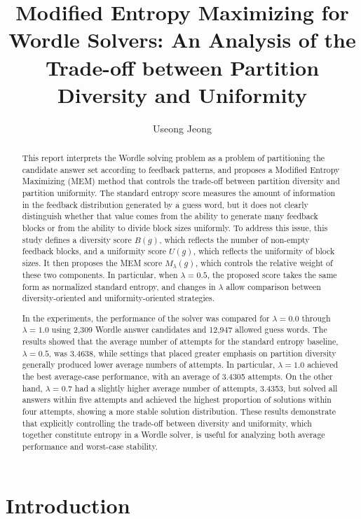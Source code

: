 \documentclass[11pt]{article}
\title{Modified Entropy Maximizing for Wordle Solvers: An Analysis of the Trade-off between Partition Diversity and Uniformity}
\author{
    Useong Jeong
}
\date{}
\begin{document}
\maketitle


\begin{abstract}
This report interprets the Wordle solving problem as a problem of partitioning the candidate answer set according to feedback patterns, and proposes a Modified Entropy Maximizing (MEM) method that controls the trade-off between partition diversity and partition uniformity.
The standard entropy score measures the amount of information in the feedback distribution generated by a guess word, but it does not clearly distinguish whether that value comes from the ability to generate many feedback blocks or from the ability to divide block sizes uniformly.
To address this issue, this study defines a diversity score $B(g)$, which reflects the number of non-empty feedback blocks, and a uniformity score $U(g)$, which reflects the uniformity of block sizes.
It then proposes the MEM score $M_{\lambda}(g)$, which controls the relative weight of these two components.
In particular, when $\lambda = 0.5$, the proposed score takes the same form as normalized standard entropy, and changes in $\lambda$ allow comparison between diversity-oriented and uniformity-oriented strategies.

In the experiments, the performance of the solver was compared for $\lambda = 0.0$ through $\lambda = 1.0$ using 2,309 Wordle answer candidates and 12,947 allowed guess words.
The results showed that the average number of attempts for the standard entropy baseline, $\lambda = 0.5$, was 3.4638, while settings that placed greater emphasis on partition diversity generally produced lower average numbers of attempts.
In particular, $\lambda = 1.0$ achieved the best average-case performance, with an average of 3.4305 attempts.
On the other hand, $\lambda = 0.7$ had a slightly higher average number of attempts, 3.4353, but solved all answers within five attempts and achieved the highest proportion of solutions within four attempts, showing a more stable solution distribution.
These results demonstrate that explicitly controlling the trade-off between diversity and uniformity, which together constitute entropy in a Wordle solver, is useful for analyzing both average performance and worst-case stability.
\end{abstract}


\section{Introduction}
\label{sec:introduction}
\end{document}
